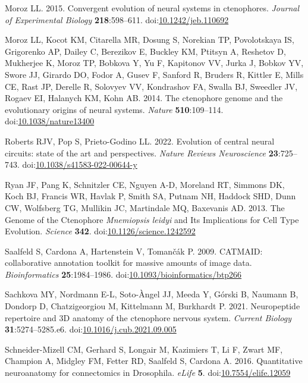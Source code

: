 \documentclass[
  11pt,
]{article}
\newlength{\cslhangindent}
\newenvironment{CSLReferences}[2] %
 {\begin{list}{}{%
  \setlength{\itemindent}{0pt}
  \setlength{\leftmargin}{0pt}
  \setlength{\parsep}{0pt}
  \ifodd #1
   \setlength{\leftmargin}{\cslhangindent}
   \setlength{\itemindent}{-1\cslhangindent}
  \fi
  \setlength{\itemsep}{#2\baselineskip}}}
 {\end{list}}
\begin{document}
\begin{CSLReferences}{1}{0}
Moroz LL. 2015. Convergent evolution of neural systems in ctenophores.
\emph{Journal of Experimental Biology} \textbf{218}:598--611.
doi:\href{https://doi.org/10.1242/jeb.110692}{10.1242/jeb.110692}

Moroz LL, Kocot KM, Citarella MR, Dosung S, Norekian TP, Povolotskaya
IS, Grigorenko AP, Dailey C, Berezikov E, Buckley KM, Ptitsyn A,
Reshetov D, Mukherjee K, Moroz TP, Bobkova Y, Yu F, Kapitonov VV, Jurka
J, Bobkov YV, Swore JJ, Girardo DO, Fodor A, Gusev F, Sanford R, Bruders
R, Kittler E, Mills CE, Rast JP, Derelle R, Solovyev VV, Kondrashov FA,
Swalla BJ, Sweedler JV, Rogaev EI, Halanych KM, Kohn AB. 2014. The
ctenophore genome and the evolutionary origins of neural systems.
\emph{Nature} \textbf{510}:109--114.
doi:\href{https://doi.org/10.1038/nature13400}{10.1038/nature13400}

Roberts RJV, Pop S, Prieto-Godino LL. 2022. Evolution of central neural
circuits: state of the art and perspectives. \emph{Nature Reviews
Neuroscience} \textbf{23}:725--743.
doi:\href{https://doi.org/10.1038/s41583-022-00644-y}{10.1038/s41583-022-00644-y}

Ryan JF, Pang K, Schnitzler CE, Nguyen A-D, Moreland RT, Simmons DK,
Koch BJ, Francis WR, Havlak P, Smith SA, Putnam NH, Haddock SHD, Dunn
CW, Wolfsberg TG, Mullikin JC, Martindale MQ, Baxevanis AD. 2013. The
Genome of the Ctenophore {\emph{Mnemiopsis leidyi}} and Its Implications
for Cell Type Evolution. \emph{Science} \textbf{342}.
doi:\href{https://doi.org/10.1126/science.1242592}{10.1126/science.1242592}

Saalfeld S, Cardona A, Hartenstein V, Tomančák P. 2009. CATMAID:
collaborative annotation toolkit for massive amounts of image data.
\emph{Bioinformatics} \textbf{25}:1984--1986.
doi:\href{https://doi.org/10.1093/bioinformatics/btp266}{10.1093/bioinformatics/btp266}

Sachkova MY, Nordmann E-L, Soto-Àngel JJ, Meeda Y, Górski B, Naumann B,
Dondorp D, Chatzigeorgiou M, Kittelmann M, Burkhardt P. 2021.
Neuropeptide repertoire and 3D anatomy of the ctenophore nervous system.
\emph{Current Biology} \textbf{31}:5274--5285.e6.
doi:\href{https://doi.org/10.1016/j.cub.2021.09.005}{10.1016/j.cub.2021.09.005}

Schneider-Mizell CM, Gerhard S, Longair M, Kazimiers T, Li F, Zwart MF,
Champion A, Midgley FM, Fetter RD, Saalfeld S, Cardona A. 2016.
Quantitative neuroanatomy for connectomics in Drosophila. \emph{eLife}
\textbf{5}.
doi:\href{https://doi.org/10.7554/elife.12059}{10.7554/elife.12059}


\end{CSLReferences}
\end{document}
